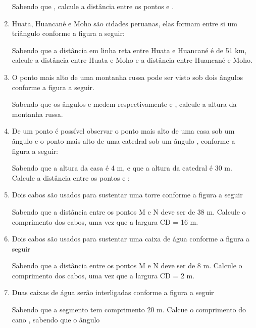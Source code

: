 \documentclass[twocolumn,oneside,a4paper,12pt]{article}
\begin{document}
\begin{enumerate}

Sabendo que , calcule a distância entre os pontos  e .

\item Huata, Huancané e Moho são cidades peruanas, elas formam entre si um triângulo conforme a figura a seguir:


Sabendo que a distância em linha reta entre Huata e Huancané é de 51 km, calcule a distância entre Huata e Moho e a distância entre Huancané e Moho.

\item O ponto mais alto de uma montanha russa pode ser visto sob dois ângulos conforme a figura a seguir.


Sabendo que os ângulos \m{\alpha} e \m{\beta} medem respectivamente  e , calcule a altura da montanha russa.

\item De um ponto  é possível observar o ponto mais alto de uma casa sob um ângulo  e o ponto mais alto de uma catedral sob um ângulo , conforme a figura a seguir:


Sabendo que a altura da casa é 4 m, e que a altura da catedral é 30 m. Calcule a distância entre os pontos  e :

\item Dois cabos são usados para sustentar uma torre conforme a figura a seguir


Sabendo que a distância entre os pontos M e N deve ser de 38 m. Calcule o comprimento dos cabos, uma vez que a largura CD = 16 m.

\item Dois cabos são usados para sustentar uma caixa de água conforme a figura a seguir


Sabendo que a distância entre os pontos M e N deve ser de 8 m. Calcule o comprimento dos cabos, uma vez que a largura CD = 2 m.

\item Duas caixas de água serão interligadas conforme a figura a seguir


Sabendo que a segmento  tem comprimento 20 m. Calcue o comprimento do cano , sabendo que o ângulo 


\end{enumerate}
\end{document}
